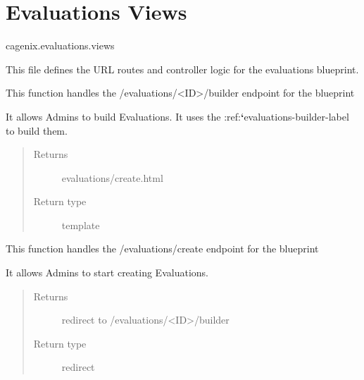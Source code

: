 \documentclass[letterpaper,10pt,english]{sphinxmanual}
\begin{document}
\section{Evaluations Views}
\label{dev-evaluations:evaluations-views}\label{dev-evaluations:evaluations-views-label}\label{dev-evaluations:module-cagenix.evaluations.views}
cagenix.evaluations.views

This file defines the URL routes and controller logic for the evaluations blueprint.

\begin{fulllineitems}
\label{dev-evaluations:cagenix.evaluations.views.evaluations_builder}
This function handles the /evaluations/\textless{}ID\textgreater{}/builder endpoint for the blueprint

It allows Admins to build Evaluations.  It uses the :ref:{\color{red}\bfseries{}{}`}evaluations-builder-label
to build them.
\begin{quote}\begin{description}
\item[{Returns}] \leavevmode
evaluations/create.html

\item[{Return type}] \leavevmode
template

\end{description}\end{quote}

\end{fulllineitems}


\begin{fulllineitems}
\label{dev-evaluations:cagenix.evaluations.views.evaluations_create}
This function handles the /evaluations/create endpoint for the blueprint

It allows Admins to start creating Evaluations.
\begin{quote}\begin{description}
\item[{Returns}] \leavevmode
redirect to /evaluations/\textless{}ID\textgreater{}/builder

\item[{Return type}] \leavevmode
redirect

\end{description}\end{quote}

\end{fulllineitems}
\end{document}

